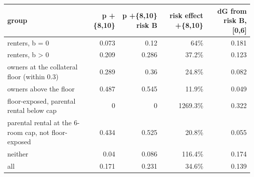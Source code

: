 \begin{tabular}{lrrrr}
\toprule
group & p +\{8,10\} & p +\{8,10\} risk B & risk effect +\{8,10\} & dG from risk B, [0,6] \\
\midrule
renters, b = 0 & 0.073 & 0.12 & 64\% & 0.181 \\
renters, b > 0 & 0.209 & 0.286 & 37.2\% & 0.123 \\
owners at the collateral floor (within 0.3) & 0.289 & 0.36 & 24.8\% & 0.082 \\
owners above the floor & 0.487 & 0.545 & 11.9\% & 0.049 \\
floor-exposed, parental rental below cap & 0 & 0 & 1269.3\% & 0.322 \\
parental rental at the 6-room cap, not floor-exposed & 0.434 & 0.525 & 20.8\% & 0.055 \\
neither & 0.04 & 0.086 & 116.4\% & 0.174 \\
all & 0.171 & 0.231 & 34.6\% & 0.139 \\
\bottomrule
\end{tabular}
